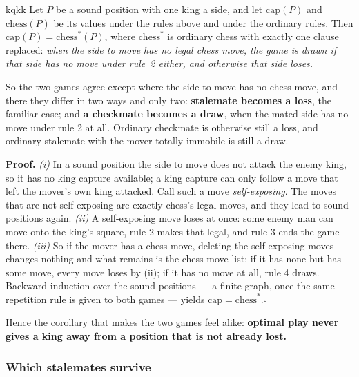 \documentclass[10pt]{article}
\begin{document}
\begin{result}[title={Theorem. With one king a side, capture rules are chess with one clause changed}]{kqkk}
Let $P$ be a sound position with one king a side, and let $\mathrm{cap}(P)$ and
$\mathrm{chess}(P)$ be its values under the rules above and under the ordinary
rules. Then $\mathrm{cap}(P)=\mathrm{chess}^{\ast}(P)$, where
$\mathrm{chess}^{\ast}$ is ordinary chess with exactly one clause replaced:
\emph{when the side to move has no legal chess move, the game is drawn if that
side has no move under rule~2 either, and otherwise that side loses.}

\smallskip
So the two games agree except where the side to move has no chess move, and
there they differ in two ways and only two: \textbf{stalemate becomes a loss},
the familiar case; and \textbf{a checkmate becomes a draw}, when the mated side
has no move under rule 2 at all. Ordinary checkmate is otherwise still a loss,
and ordinary stalemate with the mover totally immobile is still a draw.
\end{result}

\noindent
\textbf{Proof.} \emph{(i)} In a sound position the side to move does not attack
the enemy king, so it has no king capture available; a king capture can only
follow a move that left the mover's own king attacked. Call such a move
\emph{self-exposing}. The moves that are not self-exposing are exactly chess's
legal moves, and they lead to sound positions again. \emph{(ii)} A
self-exposing move loses at once: some enemy man can move onto the king's
square, rule 2 makes that legal, and rule 3 ends the game there. \emph{(iii)}
So if the mover has a chess move, deleting the self-exposing moves changes
nothing and what remains is the chess move list; if it has none but has some
move, every move loses by (ii); if it has no move at all, rule 4 draws.
Backward induction over the sound positions --- a finite graph, once the same
repetition rule is given to both games --- yields
$\mathrm{cap}=\mathrm{chess}^{\ast}$.\hfill$\square$

\smallskip
\noindent
Hence the corollary that makes the two games feel alike: \textbf{optimal play
never gives a king away from a position that is not already lost.}

\subsubsection{Which stalemates survive}\label{sub:cap-stalemates}
\end{document}
